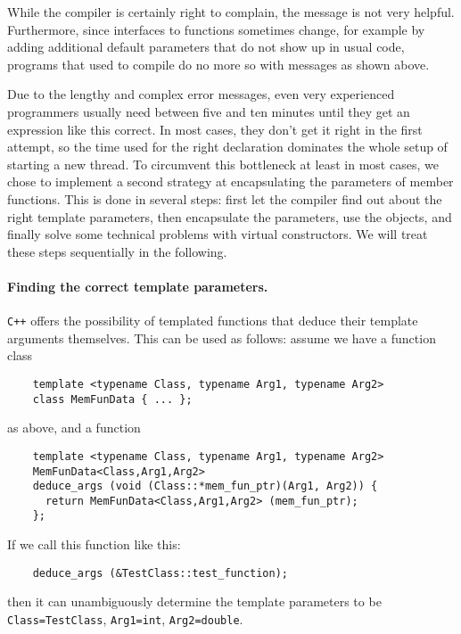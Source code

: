 \documentclass[11pt]{article}
\begin{document}
While the compiler is certainly right to complain, the message is not very
helpful. Furthermore, since interfaces to functions sometimes change, for
example by adding additional default parameters that do not show up in usual
code, programs that used to compile do no more so with messages as shown
above. 

Due to the lengthy and complex error messages, even very experienced
programmers usually need between five and ten minutes until they get an
expression like this correct. In most cases, they don't get it right in the
first attempt, so the time used for the right declaration dominates the whole
setup of starting a new thread. To circumvent this bottleneck at least in most
cases, we chose to implement a second strategy at encapsulating the parameters
of member functions. This is done in several steps: first let the compiler
find out about the right template parameters, then encapsulate the parameters,
use the objects, and finally solve some technical problems with virtual
constructors. We will treat these steps sequentially in the following.


\paragraph{Finding the correct template parameters.}
\texttt{C++} offers the possibility of templated functions that deduce their
template arguments themselves. This can be used as follows: assume we have a
function class
\begin{verbatim}
    template <typename Class, typename Arg1, typename Arg2>
    class MemFunData { ... };
\end{verbatim}
as above, and a function
\begin{verbatim}
    template <typename Class, typename Arg1, typename Arg2>
    MemFunData<Class,Arg1,Arg2>
    deduce_args (void (Class::*mem_fun_ptr)(Arg1, Arg2)) {
      return MemFunData<Class,Arg1,Arg2> (mem_fun_ptr);
    };
\end{verbatim}
If we call this function like this:
\begin{verbatim}
    deduce_args (&TestClass::test_function);
\end{verbatim}
then it can unambiguously determine the template parameters to be
\texttt{Class=TestClass}, \texttt{Arg1=int}, \texttt{Arg2=double}. 
\end{document}
